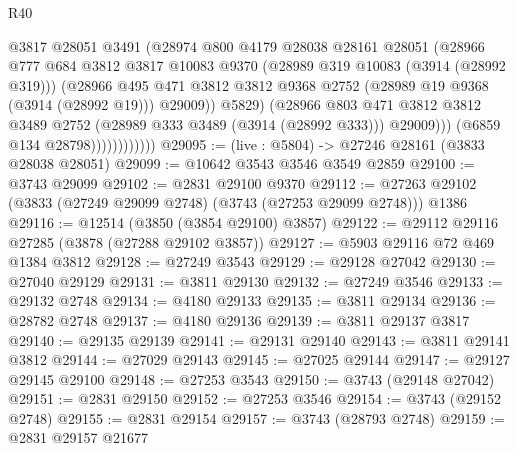 \begin{lexlean}{R40}
\begin{coremodule}
                              @3817
                              @28051
                              @3491
                              (@28974
                                @800
                                @4179
                                @28038
                                @28161
                                @28051
                                (@28966
                                  @777
                                  @684
                                  @3812
                                  @3817
                                  @10083
                                  @9370
                                  (@28989 @319 @10083 (@3914 (@28992 @319)))
                                  (@28966
                                    @495
                                    @471
                                    @3812
                                    @3812
                                    @9368
                                    @2752
                                    (@28989 @19 @9368 (@3914 (@28992 @19)))
                                    @29009))
                                @5829)
                              (@28966
                                @803
                                @471
                                @3812
                                @3812
                                @3489
                                @2752
                                (@28989 @333 @3489 (@3914 (@28992 @333)))
                                @29009)))
                          (@6859 @134 @28798))))))))))))
@29095 := (live : @5804) -> @27246 @28161 (@3833 @28038 @28051)
@29099 := @10642 @3543 @3546 @3549 @2859
@29100 := @3743 @29099
@29102 := @2831 @29100 @9370
@29112 := @27263 @29102 (@3833 (@27249 @29099 @2748) (@3743 (@27253 @29099 @2748))) @1386
@29116 := @12514 (@3850 (@3854 @29100) @3857)
@29122 := @29112 @29116 @27285 (@3878 (@27288 @29102 @3857))
@29127 := @5903 @29116 @72 @469 @1384 @3812
@29128 := @27249 @3543
@29129 := @29128 @27042
@29130 := @27040 @29129
@29131 := @3811 @29130
@29132 := @27249 @3546
@29133 := @29132 @2748
@29134 := @4180 @29133
@29135 := @3811 @29134
@29136 := @28782 @2748
@29137 := @4180 @29136
@29139 := @3811 @29137 @3817
@29140 := @29135 @29139
@29141 := @29131 @29140
@29143 := @3811 @29141 @3812
@29144 := @27029 @29143
@29145 := @27025 @29144
@29147 := @29127 @29145 @29100
@29148 := @27253 @3543
@29150 := @3743 (@29148 @27042)
@29151 := @2831 @29150
@29152 := @27253 @3546
@29154 := @3743 (@29152 @2748)
@29155 := @2831 @29154
@29157 := @3743 (@28793 @2748)
@29159 := @2831 @29157 @21677

\end{coremodule}
\end{lexlean}

